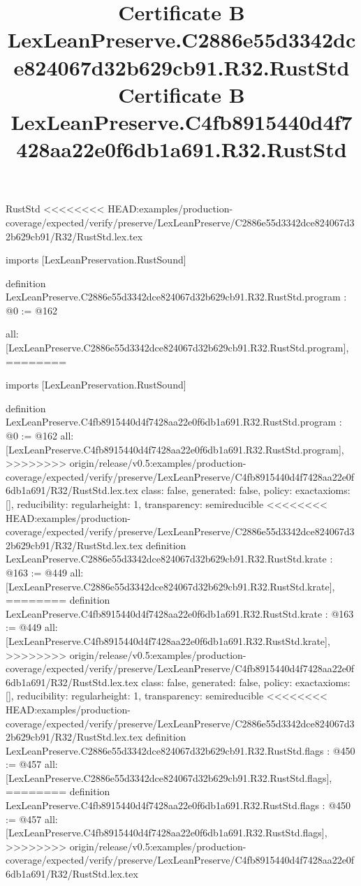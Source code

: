 \begin{lexlean}{RustStd}
<<<<<<<< HEAD:examples/production-coverage/expected/verify/preserve/LexLeanPreserve/C2886e55d3342dce824067d32b629cb91/R32/RustStd.lex.tex
\title{Certificate B LexLeanPreserve.C2886e55d3342dce824067d32b629cb91.R32.RustStd}
\begin{coremodule}
imports [LexLeanPreservation.RustSound]

definition LexLeanPreserve.C2886e55d3342dce824067d32b629cb91.R32.RustStd.program : @0 := @162 {
  all: [LexLeanPreserve.C2886e55d3342dce824067d32b629cb91.R32.RustStd.program],
========
\title{Certificate B LexLeanPreserve.C4fb8915440d4f7428aa22e0f6db1a691.R32.RustStd}
\begin{coremodule}
imports [LexLeanPreservation.RustSound]

definition LexLeanPreserve.C4fb8915440d4f7428aa22e0f6db1a691.R32.RustStd.program : @0 := @162 {
  all: [LexLeanPreserve.C4fb8915440d4f7428aa22e0f6db1a691.R32.RustStd.program],
>>>>>>>> origin/release/v0.5:examples/production-coverage/expected/verify/preserve/LexLeanPreserve/C4fb8915440d4f7428aa22e0f6db1a691/R32/RustStd.lex.tex
  class: false,
  generated: false,
  policy: exact{axioms: []},
  reducibility: regular{height: 1},
  transparency: semireducible
}
<<<<<<<< HEAD:examples/production-coverage/expected/verify/preserve/LexLeanPreserve/C2886e55d3342dce824067d32b629cb91/R32/RustStd.lex.tex
definition LexLeanPreserve.C2886e55d3342dce824067d32b629cb91.R32.RustStd.krate : @163 := @449 {
  all: [LexLeanPreserve.C2886e55d3342dce824067d32b629cb91.R32.RustStd.krate],
========
definition LexLeanPreserve.C4fb8915440d4f7428aa22e0f6db1a691.R32.RustStd.krate : @163 := @449 {
  all: [LexLeanPreserve.C4fb8915440d4f7428aa22e0f6db1a691.R32.RustStd.krate],
>>>>>>>> origin/release/v0.5:examples/production-coverage/expected/verify/preserve/LexLeanPreserve/C4fb8915440d4f7428aa22e0f6db1a691/R32/RustStd.lex.tex
  class: false,
  generated: false,
  policy: exact{axioms: []},
  reducibility: regular{height: 1},
  transparency: semireducible
}
<<<<<<<< HEAD:examples/production-coverage/expected/verify/preserve/LexLeanPreserve/C2886e55d3342dce824067d32b629cb91/R32/RustStd.lex.tex
definition LexLeanPreserve.C2886e55d3342dce824067d32b629cb91.R32.RustStd.flags : @450 := @457 {
  all: [LexLeanPreserve.C2886e55d3342dce824067d32b629cb91.R32.RustStd.flags],
========
definition LexLeanPreserve.C4fb8915440d4f7428aa22e0f6db1a691.R32.RustStd.flags : @450 := @457 {
  all: [LexLeanPreserve.C4fb8915440d4f7428aa22e0f6db1a691.R32.RustStd.flags],
>>>>>>>> origin/release/v0.5:examples/production-coverage/expected/verify/preserve/LexLeanPreserve/C4fb8915440d4f7428aa22e0f6db1a691/R32/RustStd.lex.tex
}}}
\end{coremodule}}
\end{coremodule}
\end{lexlean}
